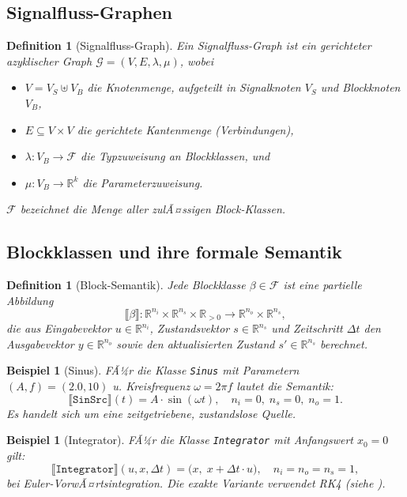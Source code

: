 ﻿\documentclass[12pt,a4paper]{article}
\newtheorem{definition}[theorem]{Definition}
\newtheorem{beispiel}[theorem]{Beispiel}
\theoremstyle{definition}
\begin{document}
\subsection{Signalfluss-Graphen}

\begin{definition}[Signalfluss-Graph]
\label{def:sfg}
Ein \emph{Signalfluss-Graph} ist ein gerichteter azyklischer Graph
$\mathcal{G} = (V, E, \lambda, \mu)$, wobei
\begin{itemize}[nosep]
  \item $V = V_S \uplus V_B$ die Knotenmenge, aufgeteilt in Signalknoten $V_S$
        und Blockknoten $V_B$,
  \item $E \subseteq V \times V$ die gerichtete Kantenmenge (Verbindungen),
  \item $\lambda : V_B \to \mathcal{F}$ die Typzuweisung an Blockklassen, und
  \item $\mu : V_B \to \mathbb{R}^k$ die Parameterzuweisung.
\end{itemize}
$\mathcal{F}$ bezeichnet die Menge aller zulÃ¤ssigen Block-Klassen.
\end{definition}

\subsection{Blockklassen und ihre formale Semantik}

\begin{definition}[Block-Semantik]
\label{def:blocksem}
Jede Blockklasse $\beta \in \mathcal{F}$ ist eine partielle Abbildung
\[
  \llbracket \beta \rrbracket : \mathbb{R}^{n_i} \times \mathbb{R}^{n_s} \times \mathbb{R}_{>0}
  \longrightarrow \mathbb{R}^{n_o} \times \mathbb{R}^{n_s},
\]
die aus Eingabevektor $u \in \mathbb{R}^{n_i}$, Zustandsvektor $s \in \mathbb{R}^{n_s}$
und Zeitschritt $\Delta t$ den Ausgabevektor $y \in \mathbb{R}^{n_o}$ sowie den
aktualisierten Zustand $s' \in \mathbb{R}^{n_s}$ berechnet.
\end{definition}

\begin{beispiel}[Sinus]
FÃ¼r die Klasse \texttt{Sinus} mit Parametern $(A, f) = (2.0, 10)$
u. Kreisfrequenz $\omega = 2\pi f$ lautet die Semantik:
\[
  \llbracket \texttt{SinSrc} \rrbracket(t) = A \cdot \sin(\omega t),\quad n_i = 0,\; n_s = 0,\; n_o = 1.
\]
Es handelt sich um eine zeitgetriebene, zustandslose Quelle.
\end{beispiel}

\begin{beispiel}[Integrator]
FÃ¼r die Klasse \texttt{Integrator} mit Anfangswert $x_0 = 0$ gilt:
\[
  \llbracket \texttt{Integrator} \rrbracket(u, x, \Delta t) =
  \bigl(x,\; x + \Delta t \cdot u\bigr),\quad n_i = n_o = n_s = 1,
\]
bei Euler-VorwÃ¤rtsintegration. Die exakte Variante verwendet RK4 (siehe ).
\end{beispiel}
\end{document}
